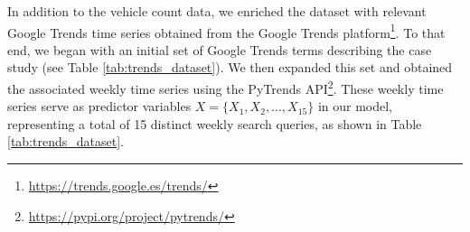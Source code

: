 \documentclass[acmsmall]{acmart}
\begin{document}
\begin{table}[ht]
\centering
\footnotesize
{}
\caption{Raw Dataset}
\label{tab:raw_dataset}
\end{table}



In addition to the vehicle count data, we enriched the dataset with relevant {\color{black} Google Trends time series} obtained from the Google Trends platform\footnote{\url{https://trends.google.es/trends/}}. {\color{black}To that end, we began with an initial set of Google Trends terms describing the case study (see Table \ref{tab:trends_dataset}). We then expanded this set and obtained the associated weekly time series using the PyTrends API\footnote{\url{https://pypi.org/project/pytrends/}}.} These weekly time series serve as predictor variables $X = \{X_1, X_2, \dots, X_{15}\}$ in our model, representing a total of 15 distinct weekly search queries, as shown in Table \ref{tab:trends_dataset}.
\end{document}
